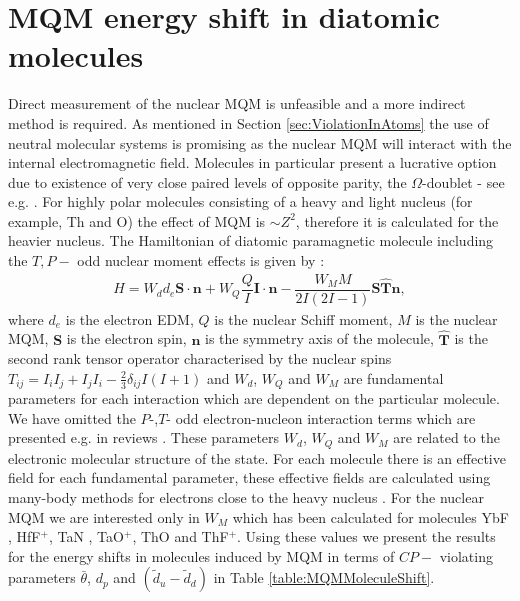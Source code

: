 \documentclass[10pt,a4paper, twoside, openright]{report}
\begin{document}
\section{MQM energy shift in diatomic molecules} \label{sec:MQMmolecule}
Direct measurement of the nuclear MQM is unfeasible and a more indirect method is required. As mentioned in Section \ref{sec:ViolationInAtoms} the use of neutral molecular systems is promising as the nuclear MQM will interact with the internal electromagnetic field. Molecules in particular present a lucrative option due to existence of very close paired levels of opposite parity, the  $\Omega$-doublet - see e.g.  \cite{Flambaum2014}. For highly polar molecules consisting of a heavy and light nucleus (for example, Th and O) the effect of MQM is $\sim Z^2$, therefore it is calculated for the heavier nucleus. The Hamiltonian of diatomic paramagnetic molecule including the $T, P-$ odd nuclear moment effects is given by \cite{SFK1984,Kozlov1995}:
\begin{align}
H = W_d d_e \mathbf{S}\cdot\mathbf{n} + W_{Q}\dfrac{Q}{I}\mathbf{I}\cdot\mathbf{n} - \dfrac{W_{M}M}{2I(2I -1)}\mathbf{S}\hat{\mathbf{T}}\mathbf{n},
\end{align}
where $d_e$ is the electron EDM, $Q$ is the nuclear Schiff moment, $M$ is the nuclear MQM, $\mathbf{S}$ is the electron spin, $\mathbf{n}$ is the symmetry axis of the molecule, $\hat{\mathbf{T}} $ is the second rank tensor operator characterised by the nuclear spins $T_{ij} = I_iI_j + I_jI_i - \tfrac{2}{3}\delta_{ij}I(I + 1)$  and  $W_d$, $W_Q$ and $W_M$ are fundamental parameters for each interaction which are dependent on the particular molecule. We have omitted the $P$-,$T$- odd electron-nucleon interaction terms which are presented e.g. in reviews \cite{Safronova2017,GF2004}. 
These parameters $W_d$, $W_Q$ and $W_M$
are related to the electronic molecular structure of the state. For each molecule there is an effective field for each fundamental parameter, these effective fields are calculated using many-body methods for electrons close to the heavy nucleus \cite{Flambaum2014}.  For the nuclear MQM we are interested only in $W_M$ which has been calculated for molecules YbF \cite{Kozlov1995}, HfF$^{+}$\cite{Skripnikov2017}, TaN \cite{Skripnikov2015Ta, Fleig2016TaN}, TaO$^+$\cite{Fleig2018}, ThO \cite{Skripnikov2014ThO} and ThF$^+$\cite{Skripnikov2015Th}. 
Using these values we present the results for the energy shifts in molecules induced by MQM in terms of $CP-$ violating parameters $\bar{\theta}$, $d_p$  and $(\tilde{d}_u -\tilde{d}_d)$ in Table \ref{table:MQMMoleculeShift}. \\
\end{document}
